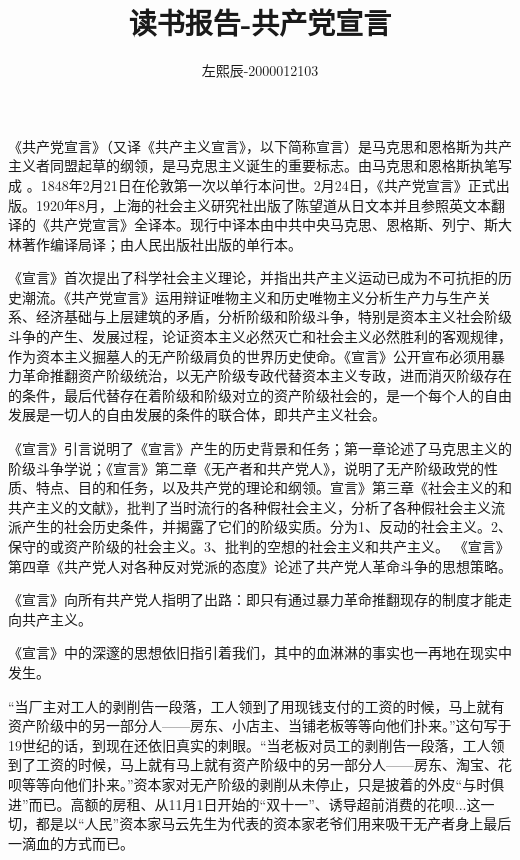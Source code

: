 \documentclass[UTF8]{ctexart}
\title{读书报告-共产党宣言}
\author{左熙辰-2000012103}
\begin{document}
    \maketitle
    《共产党宣言》（又译《共产主义宣言》，以下简称宣言）是马克思和恩格斯为共产主义者同盟起草的纲领，是马克思主义诞生的重要标志。由马克思和恩格斯执笔写成 。1848年2月21日在伦敦第一次以单行本问世。2月24日，《共产党宣言》正式出版。1920年8月，上海的社会主义研究社出版了陈望道从日文本并且参照英文本翻译的《共产党宣言》全译本。现行中译本由中共中央马克思、恩格斯、列宁、斯大林著作编译局译；由人民出版社出版的单行本。

    《宣言》首次提出了科学社会主义理论，并指出共产主义运动已成为不可抗拒的历史潮流。《共产党宣言》运用辩证唯物主义和历史唯物主义分析生产力与生产关系、经济基础与上层建筑的矛盾，分析阶级和阶级斗争，特别是资本主义社会阶级斗争的产生、发展过程，论证资本主义必然灭亡和社会主义必然胜利的客观规律，作为资本主义掘墓人的无产阶级肩负的世界历史使命。《宣言》公开宣布必须用暴力革命推翻资产阶级统治，以无产阶级专政代替资本主义专政，进而消灭阶级存在的条件，最后代替存在着阶级和阶级对立的资产阶级社会的，是一个每个人的自由发展是一切人的自由发展的条件的联合体，即共产主义社会。

    《宣言》引言说明了《宣言》产生的历史背景和任务；第一章论述了马克思主义的阶级斗争学说；《宣言》第二章《无产者和共产党人》，说明了无产阶级政党的性质、特点、目的和任务，以及共产党的理论和纲领。宣言》第三章《社会主义的和共产主义的文献》，批判了当时流行的各种假社会主义，分析了各种假社会主义流派产生的社会历史条件，并揭露了它们的阶级实质。分为1、反动的社会主义。2、保守的或资产阶级的社会主义。3、批判的空想的社会主义和共产主义。
    《宣言》第四章《共产党人对各种反对党派的态度》论述了共产党人革命斗争的思想策略。
    
    《宣言》向所有共产党人指明了出路：即只有通过暴力革命推翻现存的制度才能走向共产主义。

    《宣言》中的深邃的思想依旧指引着我们，其中的血淋淋的事实也一再地在现实中发生。
    
    “当厂主对工人的剥削告一段落，工人领到了用现钱支付的工资的时候，马上就有资产阶级中的另一部分人——房东、小店主、当铺老板等等向他们扑来。”这句写于19世纪的话，到现在还依旧真实的刺眼。“当老板对员工的剥削告一段落，工人领到了工资的时候，马上就有马上就有资产阶级中的另一部分人——房东、淘宝、花呗等等向他们扑来。”资本家对无产阶级的剥削从未停止，只是披着的外皮“与时俱进”而已。高额的房租、从11月1日开始的“双十一”、诱导超前消费的花呗...这一切，都是以“人民”资本家马云先生为代表的资本家老爷们用来吸干无产者身上最后一滴血的方式而已。
\end{document}
